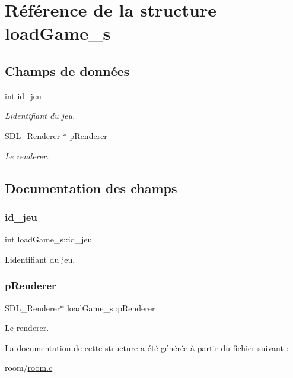 \hypertarget{structload_game__s}{}\section{Référence de la structure load\+Game\+\_\+s}
\label{structload_game__s}
\subsection*{Champs de données}
\begin{DoxyCompactItemize}
\item 
int \hyperlink{structload_game__s_a0a6f6b9e49925bba6504d7af4bc0ad6e}{id\+\_\+jeu}
\begin{DoxyCompactList}\small\item\em L\textquotesingle{}identifiant du jeu. \end{DoxyCompactList}\item 
S\+D\+L\+\_\+\+Renderer $\ast$ \hyperlink{structload_game__s_a4ec3ce1c80db834347b9b4aa6b70bc59}{p\+Renderer}
\begin{DoxyCompactList}\small\item\em Le renderer. \end{DoxyCompactList}\end{DoxyCompactItemize}


\subsection{Documentation des champs}
\mbox{\label{structload_game__s_a0a6f6b9e49925bba6504d7af4bc0ad6e}} 
\subsubsection{\texorpdfstring{id\+\_\+jeu}{id\_jeu}}
{\footnotesize\ttfamily int load\+Game\+\_\+s\+::id\+\_\+jeu}



L\textquotesingle{}identifiant du jeu. 

\mbox{\label{structload_game__s_a4ec3ce1c80db834347b9b4aa6b70bc59}} 
\subsubsection{\texorpdfstring{p\+Renderer}{pRenderer}}
{\footnotesize\ttfamily S\+D\+L\+\_\+\+Renderer$\ast$ load\+Game\+\_\+s\+::p\+Renderer}



Le renderer. 



La documentation de cette structure a été générée à partir du fichier suivant \+:\begin{DoxyCompactItemize}
\item 
room/\hyperlink{room_8c}{room.\+c}\end{DoxyCompactItemize}
